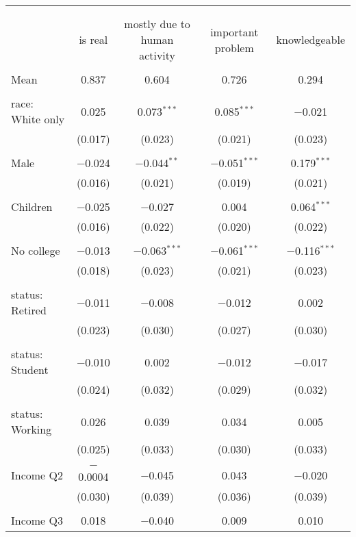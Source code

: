 
\begin{tabular}{@{\extracolsep{5pt}}lcccc} 
\\[-1.8ex]\hline 
\hline \\[-1.8ex] 
\\[-1.8ex] & is real & mostly due to human activity & important problem & knowledgeable \\ 
\hline \\[-1.8ex] 
 Mean & 0.837 & 0.604 & 0.726 & 0.294  \\ \hline \\[-1.8ex] race: White only & 0.025 & 0.073$^{***}$ & 0.085$^{***}$ & $-$0.021 \\ 
  & (0.017) & (0.023) & (0.021) & (0.023) \\ 
  & & & & \\ 
 Male & $-$0.024 & $-$0.044$^{**}$ & $-$0.051$^{***}$ & 0.179$^{***}$ \\ 
  & (0.016) & (0.021) & (0.019) & (0.021) \\ 
  & & & & \\ 
 Children & $-$0.025 & $-$0.027 & 0.004 & 0.064$^{***}$ \\ 
  & (0.016) & (0.022) & (0.020) & (0.022) \\ 
  & & & & \\ 
 No college & $-$0.013 & $-$0.063$^{***}$ & $-$0.061$^{***}$ & $-$0.116$^{***}$ \\ 
  & (0.018) & (0.023) & (0.021) & (0.023) \\ 
  & & & & \\ 
 status: Retired & $-$0.011 & $-$0.008 & $-$0.012 & 0.002 \\ 
  & (0.023) & (0.030) & (0.027) & (0.030) \\ 
  & & & & \\ 
 status: Student & $-$0.010 & 0.002 & $-$0.012 & $-$0.017 \\ 
  & (0.024) & (0.032) & (0.029) & (0.032) \\ 
  & & & & \\ 
 status: Working & 0.026 & 0.039 & 0.034 & 0.005 \\ 
  & (0.025) & (0.033) & (0.030) & (0.033) \\ 
  & & & & \\ 
 Income Q2 & $-$0.0004 & $-$0.045 & 0.043 & $-$0.020 \\ 
  & (0.030) & (0.039) & (0.036) & (0.039) \\ 
  & & & & \\ 
 Income Q3 & 0.018 & $-$0.040 & 0.009 & 0.010 \\ 

\end{tabular}
